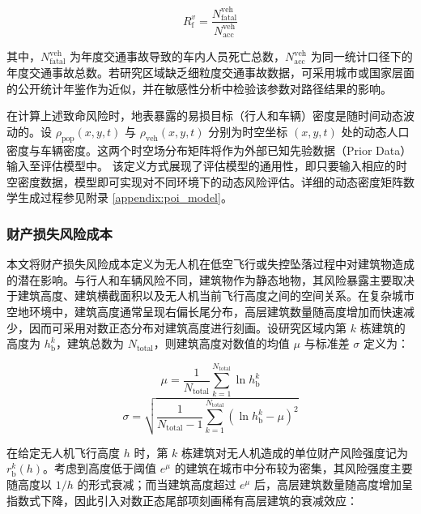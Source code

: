 \begin{equation}
R_{\mathrm{f}}^v =
\frac{N_{\mathrm{fatal}}^{\mathrm{veh}}}{N_{\mathrm{acc}}^{\mathrm{veh}}}
\label{eq:vehicle_fatality_rate}
\end{equation}

其中，$N_{\mathrm{fatal}}^{\mathrm{veh}}$ 为年度交通事故导致的车内人员死亡总数，$N_{\mathrm{acc}}^{\mathrm{veh}}$ 为同一统计口径下的年度交通事故总数。若研究区域缺乏细粒度交通事故数据，可采用城市或国家层面的公开统计年鉴作为近似，并在敏感性分析中检验该参数对路径结果的影响。

在计算上述致命风险时，地表暴露的易损目标（行人和车辆）密度是随时间动态波动的。设 $\rho_{\mathrm{pop}}(x,y,t)$ 与 $\rho_{\mathrm{veh}}(x,y,t)$ 分别为时空坐标 $(x,y,t)$ 处的动态人口密度与车辆密度。这两个时空场分布矩阵将作为外部已知先验数据（Prior Data）输入至评估模型中。
该定义方式展现了评估模型的通用性，即只要输入相应的时空密度数据，模型即可实现对不同环境下的动态风险评估。详细的动态密度矩阵数学生成过程参见附录 \ref{appendix:poi_model}。


\subsubsection{财产损失风险成本}

本文将财产损失风险成本定义为无人机在低空飞行或失控坠落过程中对建筑物造成的潜在影响。与行人和车辆风险不同，建筑物作为静态地物，其风险暴露主要取决于建筑高度、建筑横截面积以及无人机当前飞行高度之间的空间关系。在复杂城市空地环境中，建筑高度通常呈现右偏长尾分布，高层建筑数量随高度增加而快速减少，因而可采用对数正态分布对建筑高度进行刻画。设研究区域内第 $k$ 栋建筑的高度为 $h_{\mathrm{b}}^k$，建筑总数为 $N_{\mathrm{total}}$，则建筑高度对数值的均值 $\mu$ 与标准差 $\sigma$ 定义为：

\begin{equation}
\mu = \frac{1}{N_{\mathrm{total}}}
\sum_{k=1}^{N_{\mathrm{total}}} \ln h_{\mathrm{b}}^k
\label{eq:building_height_mean}
\end{equation}
\begin{equation}
\sigma =
\sqrt{
\frac{1}{N_{\mathrm{total}} - 1}
\sum_{k=1}^{N_{\mathrm{total}}}
\left(\ln h_{\mathrm{b}}^k - \mu\right)^2
}
\label{eq:building_height_std}
\end{equation}

在给定无人机飞行高度 $h$ 时，第 $k$ 栋建筑对无人机造成的单位财产风险强度记为 $r_{\mathrm{b}}^k(h)$。考虑到高度低于阈值 $e^\mu$ 的建筑在城市中分布较为密集，其风险强度主要随高度以 $1/h$ 的形式衰减；而当建筑高度超过 $e^\mu$ 后，高层建筑数量随高度增加呈指数式下降，因此引入对数正态尾部项刻画稀有高层建筑的衰减效应：

